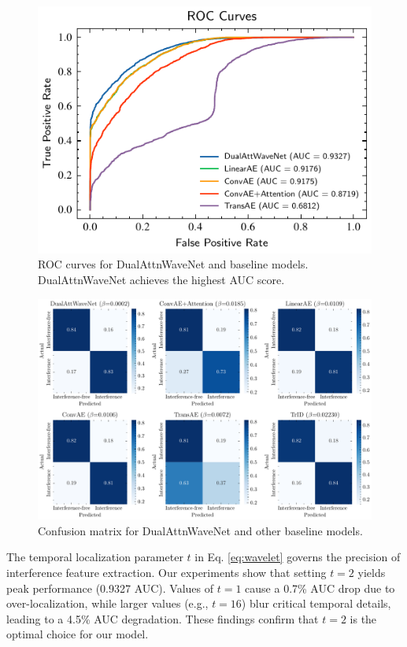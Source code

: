 \documentclass[conference]{IEEEtran}
\begin{document}
\begin{figure}[t]
    \centering
    \includegraphics[width=0.7\linewidth]{roc-comparison.pdf}
    \caption{ROC curves for DualAttnWaveNet and baseline models. DualAttnWaveNet achieves the highest AUC score.}
    \label{fig:roc_comparison}
\end{figure}

\begin{figure}[tb]
    \centering
    \includegraphics[width=\linewidth]{confusion.pdf}
    \caption{Confusion matrix for DualAttnWaveNet and other baseline models.}
    \label{fig:confusion_matrix}
\end{figure}

The temporal localization parameter $t$ in Eq. \ref{eq:wavelet} governs the precision of interference feature extraction. Our experiments show that setting $t=2$ yields peak performance (0.9327 AUC). Values of $t=1$ cause a 0.7\% AUC drop due to over-localization, while larger values (e.g., $t=16$) blur critical temporal details, leading to a 4.5\% AUC degradation. These findings confirm that $t=2$ is the optimal choice for our model.
\end{document}
